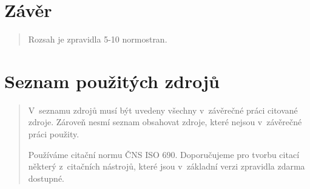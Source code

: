 \documentclass[
]{article}
\begin{document}

%




    \newpage
    \hypertarget{zuxe1vux11br}{%


        \section{Závěr}\label{zuxe1vux11br}}

    \begin{quote}
        Rozsah je zpravidla 5-10 normostran.
    \end{quote}

    \newpage
    \hypertarget{seznam-pouux17eituxfdch-zdrojux16f}{%
        \section{Seznam použitých
        zdrojů}\label{seznam-pouux17eituxfdch-zdrojux16f}}

    \begin{quote}
        V~seznamu zdrojů musí být uvedeny všechny v~závěrečné práci citované
        zdroje. Zároveň nesmí seznam obsahovat zdroje, které nejsou v~závěrečné
        práci použity.

        Používáme citační normu ČNS ISO 690. Doporučujeme pro tvorbu citací
        některý z~citačních nástrojů, které jsou v~základní verzi zpravidla
        zdarma dostupné.
    \end{quote}
\end{document}

